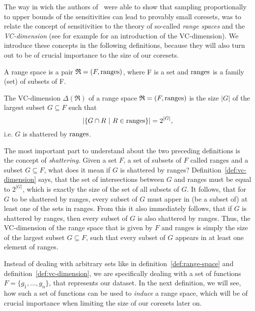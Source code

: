 The way in wich the authors of~\cite{feldman-langberg-coresets}
were able to show that sampling proportionally to upper bounds of the
sensitivities can lead to provably small coresets,
was to relate the concept of sensitivities to
the theory of so-called \textit{range spaces} and
the \textit{VC-dimension}
(see for example \cite{computational-learning-theory} for an
introduction of the VC-dimension).
We introduce these concepts in the following definitions, because
they will also turn out to be of crucial importance to the
size of our coresets.

\begin{definition}
    \label{def:range-space}
    A range space is a pair $\mathfrak{R} = (F, \textup{ranges})$, where F is a set
    and $\textup{ranges}$ is a family (set) of subsets of F.
\end{definition}

\begin{definition}
    \label{def:vc-dimension}
    The VC-dimension $\Delta(\mathfrak{R})$ of a range space
    $\mathfrak{R} = (F, \textup{ranges})$ is
    the size $|G|$ of the largest subset $G \subseteq F$ such that
    \begin{equation*}
        \left| \left\{ G \cap R \ | \ R \in \textup{ranges} \right\} \right|
        = 2^{|G|},
    \end{equation*}
    i.e. $G$ is shattered by $\textup{ranges}$.
\end{definition}

The most important part to understand about the two preceding definitions
is the concept of \textit{shattering}.
Given a set $F$, a set of subsets of $F$ called ranges and a subset
$G \subseteq F$, what does it mean if $G$ is shattered by ranges?
Definition~\ref{def:vc-dimension} says, that the set of intersections
between $G$ and ranges must be equal to $2^{|G|}$, which is exactly
the size of the set of all subsets of $G$.
It follows, that for $G$ to be shattered by ranges, every subset
of $G$ must apper in (be a subset of) at least one of the sets in ranges.
From this it also immediately follows, that if $G$ is shattered by
ranges, then every subset of $G$ is also shattered by ranges.
Thus, the VC-dimension of the range space that is given by $F$ and
ranges is simply the size of the largest subset $G \subseteq F$,
such that every subset of
$G$ appears in at least one element of ranges.

Instead of dealing with arbitrary sets like in
definition~\ref{def:range-space} and definition~\ref{def:vc-dimension},
we are specifically dealing with a set of functions
$F = \{g_1, ..., g_n\}$, that represents our dataset.
In the next definition, we will see, how such a set of functions
can be used to \textit{induce} a range space, which will
be of crucial importance when limiting the size of
our coresets later on.

